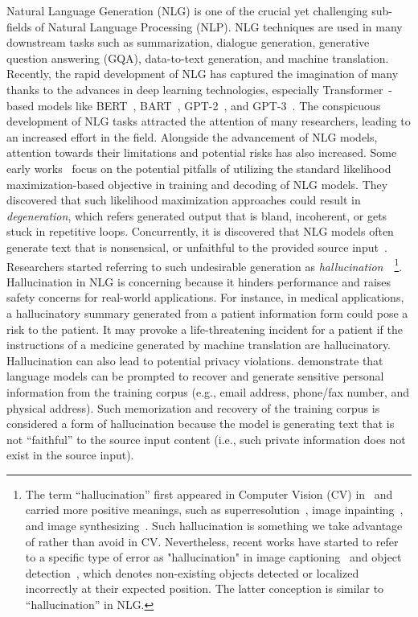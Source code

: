 

\label{section:introduction}
Natural Language Generation (NLG)  is one of the crucial yet challenging sub-fields of Natural Language Processing (NLP). NLG techniques are used in many downstream tasks such as summarization, dialogue generation, generative question answering (GQA), data-to-text generation, and machine translation. Recently, the rapid development of NLG has captured the imagination of many thanks to the advances in deep learning technologies, especially  Transformer~-based models like BERT~, BART~, GPT-2~, and GPT-3~. The conspicuous development of NLG tasks attracted the attention of many researchers, leading to an increased effort in the field. 
Alongside the advancement of NLG models, attention towards their limitations and potential risks has also increased.
Some early works~ focus on the potential pitfalls of utilizing the standard likelihood maximization-based objective in training and decoding of NLG models. They discovered that such likelihood maximization approaches could result in \textit{degeneration}, which refers generated output that is bland, incoherent, or gets stuck in repetitive loops. 
Concurrently, it is discovered that NLG models often generate text that is nonsensical, or unfaithful to the provided source input~. Researchers started referring to such undesirable generation as \textit{hallucination}~~\footnote{The term ``hallucination'' first appeared in Computer Vision (CV) in~ and carried more positive meanings, such as superresolution~, image inpainting~, and image synthesizing~. Such hallucination is something we take advantage of rather than avoid in CV. 
Nevertheless, recent works have started to refer to a specific type of error as "hallucination" in image captioning~ and object detection~, which denotes non-existing objects detected or localized incorrectly at their expected position. The latter conception is similar to ``hallucination'' in NLG.}.
Hallucination in NLG is concerning because it hinders performance and raises safety concerns for real-world applications.
For instance, in medical applications, a hallucinatory summary generated from a patient information form could pose a risk to the patient. 
It may provoke a life-threatening incident for a patient if the instructions of a medicine generated by machine translation are hallucinatory.
Hallucination can also lead to potential privacy violations.  demonstrate that language models can be prompted to recover and generate sensitive personal information from the training corpus (e.g., email address, phone/fax number, and physical address). Such memorization and recovery of the training corpus is considered a form of hallucination because the model is generating text that is not ``faithful'' to the source input content (i.e., such private information does not exist in the source input).
